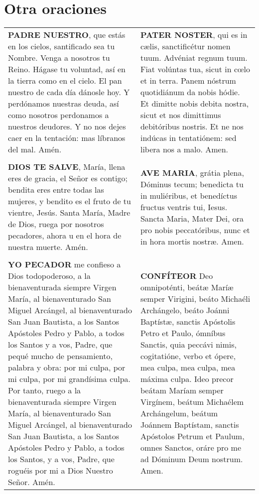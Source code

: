 \documentclass[./rosary.tex]{subfiles}
\begin{document}
\chapter*{Otra oraciones}

\begin{longtable} { p{} p{} }
    \label{ourFather}
    \textbf{PADRE NUESTRO}, que estás en los cielos, santificado sea tu Nombre. Venga a nosotros tu Reino.
    Hágase tu voluntad, así en la tierra como en el cielo. El pan nuestro de cada día dánosle hoy.
    Y perdónamos nuestras deuda, así como nosotros perdonamos a nuestros deudores.
    Y no nos dejes caer en la tentación: mas líbranos del mal. Amén.

        &

    \textbf{PATER NOSTER}, qui es in cælis, sanctificétur nomen tuum. Advéniat regnum tuum.
    Fiat volúntas tua, sicut in cœlo et in terra. Panem nóstrum quotidiánum da nobis hódie.
    Et dimitte nobis debita nostra, sicut et nos dimittimus debitóribus nostris.
    Et ne nos indúcas in tentatiónem: sed libera nos a malo. Amen.\\\\

    \label{hailMary}
    \textbf{DIOS TE SALVE}, María, llena eres de gracia, el Señor es contigo; bendita eres entre todas las mujeres,
    y bendito es el fruto de tu vientre, Jesús. Santa María, Madre de Dios, ruega por nosotros pecadores,
    ahora u en el hora de nuestra muerte. Amén.

        &

    \textbf{AVE MARIA}, grátia plena, Dóminus tecum; benedicta tu in muliéribus, et benedíctus fructus ventris tui,
    Iesus. Sancta Maria, Mater Dei, ora pro nobis peccatóribus, nunc et in hora mortis nostræ. Amen.\\\\

    \label{iConfess}
    \textbf{YO PECADOR} me confieso a Dios todopoderoso, a la bienaventurada siempre Virgen María, al bienaventurado San Miguel Arcángel,
    al bienaventurado San Juan Bautista, a los Santos Apóstoles Pedro y Pablo, a todos los Santos y a vos, Padre, que pequé mucho
    de pensamiento, palabra y obra: por mi culpa, por mi culpa, por mi grandísima culpa. Por tanto, ruego a la bienaventurada
    siempre Virgen María, al bienaventurado San Miguel Arcángel, al bienaventurado San Juan Bautista, a los Santos Apóstoles
    Pedro y Pablo, a todos los Santos, y a vos, Padre, que roguéis por mi a Dios Nuestro Señor. Amén.
    
        &

    \textbf{CONFÍTEOR} Deo omnipoténti, beátæ Maríæ semper Virigini, beáto Michaéli Archángelo, beáto Joánni Baptístæ, sanctis Apóstolis Petro et Paulo,
    ómníbus Sanctis, quia peccávi nimis, cogitatióne, verbo et ópere, mea culpa, mea culpa, mea máxima culpa. Ideo precor beátam
    Maríam semper Virgínem, beátum Michaélem Archángelum, beátum Joánnem Baptístam, sanctis Apóstolos Petrum et Paulum, omnes Sanctos,
    oráre pro me ad Dóminum Deum nostrum. Amen.
\end{longtable}
\end{document}
